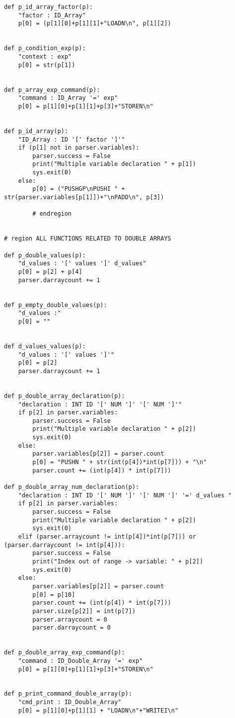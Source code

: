 \documentclass[11pt,a4paper]{report}%
\begin{document}
\begin{verbatim}
def p_id_array_factor(p):
    "factor : ID_Array"
    p[0] = (p[1][0]+p[1][1]+"LOADN\n", p[1][2])


def p_condition_exp(p):
    "context : exp"
    p[0] = str(p[1])


def p_array_exp_command(p):
    "command : ID_Array '=' exp"
    p[0] = p[1][0]+p[1][1]+p[3]+"STOREN\n"


def p_id_array(p):
    "ID_Array : ID '[' factor ']'"
    if (p[1] not in parser.variables):
        parser.success = False
        print("Multiple variable declaration " + p[1])
        sys.exit(0)
    else:
        p[0] = ("PUSHGP\nPUSHI " + str(parser.variables[p[1]])+"\nPADD\n", p[3])

        # endregion


# region ALL FUNCTIONS RELATED TO DOUBLE ARRAYS

def p_double_values(p):
    "d_values : '[' values ']' d_values"
    p[0] = p[2] + p[4]
    parser.darraycount += 1


def p_empty_double_values(p):
    "d_values :"
    p[0] = ""


def d_values_values(p):
    "d_values : '[' values ']'"
    p[0] = p[2]
    parser.darraycount += 1


def p_double_array_declaration(p):
    "declaration : INT ID '[' NUM ']' '[' NUM ']'"
    if p[2] in parser.variables:
        parser.success = False
        print("Multiple variable declaration " + p[2])
        sys.exit(0)
    else:
        parser.variables[p[2]] = parser.count
        p[0] = "PUSHN " + str(int(p[4])*int(p[7])) + "\n"
        parser.count += (int(p[4]) * int(p[7]))

def p_double_array_num_declaration(p):
    "declaration : INT ID '[' NUM ']' '[' NUM ']' '=' d_values "
    if p[2] in parser.variables:
        parser.success = False
        print("Multiple variable declaration " + p[2])
        sys.exit(0)
    elif (parser.arraycount != int(p[4])*int(p[7])) or (parser.darraycount != int(p[4])):
        parser.success = False
        print("Index out of range -> variable: " + p[2])
        sys.exit(0)
    else:
        parser.variables[p[2]] = parser.count
        p[0] = p[10]
        parser.count += (int(p[4]) * int(p[7]))
        parser.size[p[2]] = int(p[7])
        parser.arraycount = 0
        parser.darraycount = 0


def p_double_array_exp_command(p):
    "command : ID_Double_Array '=' exp"
    p[0] = p[1][0]+p[1][1]+p[3]+"STOREN\n"


def p_print_command_double_array(p):
    "cmd_print : ID_Double_Array"
    p[0] = p[1][0]+p[1][1] + "LOADN\n"+"WRITEI\n"



\end{verbatim}
\end{document}
